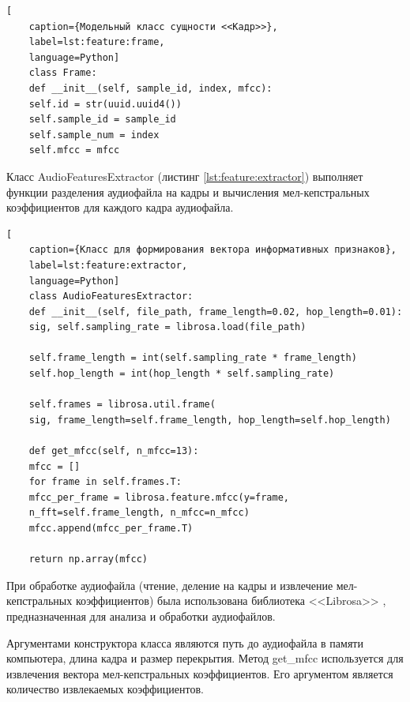 \begin{lstlisting}[
	caption={Модельный класс сущности <<Кадр>>},
	label=lst:feature:frame,
	language=Python]
	class Frame:
	def __init__(self, sample_id, index, mfcc):
	self.id = str(uuid.uuid4())
	self.sample_id = sample_id
	self.sample_num = index
	self.mfcc = mfcc
\end{lstlisting}

Класс AudioFeaturesExtractor (листинг \ref{lst:feature:extractor}) выполняет функции разделения аудиофайла на кадры и вычисления мел-кепстральных коэффициентов для каждого кадра аудиофайла.
\begin{lstlisting}[
	caption={Класс для формирования вектора информативных признаков},
	label=lst:feature:extractor,
	language=Python]
	class AudioFeaturesExtractor:
	def __init__(self, file_path, frame_length=0.02, hop_length=0.01):
	sig, self.sampling_rate = librosa.load(file_path)
	
	self.frame_length = int(self.sampling_rate * frame_length)
	self.hop_length = int(hop_length * self.sampling_rate)
	
	self.frames = librosa.util.frame(
	sig, frame_length=self.frame_length, hop_length=self.hop_length)
	
	def get_mfcc(self, n_mfcc=13):
	mfcc = []
	for frame in self.frames.T:
	mfcc_per_frame = librosa.feature.mfcc(y=frame, 
	n_fft=self.frame_length, n_mfcc=n_mfcc)
	mfcc.append(mfcc_per_frame.T)
	
	return np.array(mfcc)
\end{lstlisting}
При обработке аудиофайла (чтение, деление на кадры и извлечение мел-кепстральных коэффициентов) была использована библиотека <<Librosa>> \cite{librosa}, предназначенная для анализа и обработки аудиофайлов. 

Аргументами конструктора класса являются путь до аудиофайла в памяти компьютера, длина кадра и размер перекрытия. Метод get\_mfcc используется для извлечения вектора мел-кепстральных коэффициентов. Его аргументом является количество извлекаемых коэффициентов.

